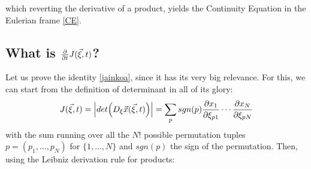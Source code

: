 \documentclass[11pt, a4paper]{article} %
\DeclareRobustCommand{\mybox}[2][gray!10]{%
\begin{tcolorbox}[   %
        left=0.2cm,
        right=0.2cm,
        top=0.15cm,
        bottom=0.15cm,
        colback=#1,
        colframe=#1,
        width=\dimexpr\textwidth\relax, 
        enlarge left by=0mm,
        boxsep=5pt,
        arc=0pt,outer arc=0pt,
        ]
        #2
\end{tcolorbox}
}
\begin{document}
which reverting the derivative of a product, yields the Continuity Equation in the Eulerian frame \eqref{CE}.\vspace{0.1cm}
\mybox{
\subsection*{ What is $\pdv{}{t}J(\vec{\xi},t)$?\vspace{-0.1cm}}
Let us prove the identity \eqref{jainkoa}, since it has its very big relevance. For this, we can start from the definition of determinant in all of its glory:
\begin{equation}
J(\vec{\xi},t)=\qty|det \Big( D_\xi \vec{x}(\vec{\xi},t) \Big)|=\sum_p sgn(p) \pdv{x_1}{\xi_{p1}} \cdots \pdv{x_N}{\xi_{pN}}
\end{equation}
with the sum running over all the $N!$ possible permutation tuples $p=(p_1,...,p_N)$ for $\{1,...,N\}$ and $sgn(p)$ the sign of the permutation. Then, using the Leibniz derivation rule for products:}
\end{document}
